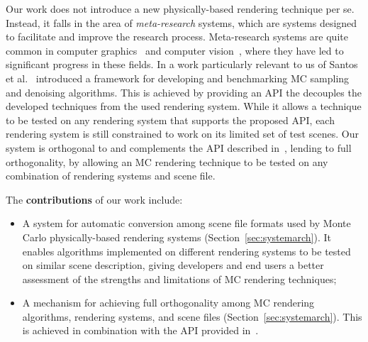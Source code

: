 Our work does not introduce a new physically-based rendering technique per se. Instead, it falls in the area of {\it meta-research} systems, which are systems designed to facilitate and improve the research process. Meta-research systems are quite common in computer graphics~\cite{Santos:2018:FBKSD, Ragan-Kelley2012,Buck2004,Mark2003} and computer vision~\cite{MiddleburyStereo, MiddleburyFlow, AlphaMatting, VideoMatting}, where they have led to significant progress in these fields. In a work particularly relevant to us of Santos et al.~\cite{Santos:2018:FBKSD} introduced a framework for developing and benchmarking MC sampling and denoising algorithms. This is achieved by providing an API the decouples the developed techniques from the used rendering system. While it allows a technique to be tested on any rendering system that supports the proposed API, each rendering system is still constrained to work on its limited set of test scenes. Our system is orthogonal to and complements the API described in~\cite{Santos:2018:FBKSD}, lending to full orthogonality, by allowing an MC rendering technique to be tested on any combination of rendering systems and scene file.     

The {\bf contributions} of our work include:
\begin{itemize}
	\item A system for automatic conversion among scene file formats used by Monte Carlo physically-based rendering systems (Section~\ref{sec:systemarch}).
	It enables algorithms implemented on different rendering systems to be tested on similar scene description, giving developers and end users a better assessment of the strengths and limitations of MC rendering techniques;
	\item A mechanism for achieving full orthogonality among MC rendering algorithms, rendering systems, and scene files (Section~\ref{sec:systemarch}). This is achieved in combination with the API provided in~\cite{Santos:2018:FBKSD}. 
\end{itemize}

